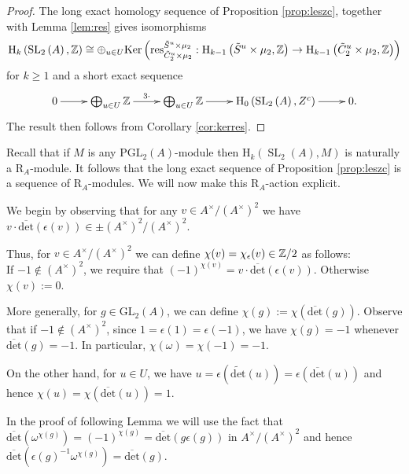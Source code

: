 \documentclass[12pt]{amsart}
\theoremstyle{definition}
\newcommand{\Z}{\Bbb{Z}}
\newcommand{\spl}[2]{\operatorname{SL}_{#1}\left(#2\right)}
\newcommand{\gl}[2]{\mathrm{GL}_{#1}(#2)}
\newcommand{\pgl}[2]{\mathrm{PGL}_{#1}(#2)}
\newcommand{\<}{\langle}
\renewcommand{\>}{\rangle}
\newcommand{\Ker}[1]{\mathrm{Ker}\left( #1\right)}
\newcommand{\sgr}[1]{\mathrm{R}_{#1}}%
\newcommand{\odet}{\overline{\mathrm{det}}}
\newcommand{\oodet}{\widetilde{\mathrm{det}}}
\newcommand{\ho}[3]{\mathrm{H}_{#1}\left( #2,#3 \right)}
\newcommand{\Res}[2]{\mathrm{res}_{#1}^{#2}}
\begin{document}
\begin{proof} The long exact homology sequence of Proposition \ref{prop:leszc}, together with Lemma \ref{lem:res} gives isomorphisms
\[
\ho{k}{\spl{2}{A}}{\Z}\cong \oplus_{u\in U}\Ker{\Res{\tilde{C}_2^u\times\mu_2}{\tilde{S}^u\times\mu_2}:\ho{k-1}{\tilde{S}^u\times\mu_2}{\Z}\to\ho{k-1}{\tilde{C}_2^u\times\mu_2}{\Z}}
\]
for $k\geq 1$ and a short exact sequence
\[
\xymatrix{
0\ar[r]&\bigoplus_{u\in U}\Z\ar^-{3\cdot}[r]&\bigoplus_{u\in U}\Z\ar[r]&\ho{0}{\spl{2}{A}}{Z^c}\ar[r]&0.\\
}
\]
The result then follows from Corollary \ref{cor:kerres}.
\end{proof}



Recall that if $M$ is any $\pgl{2}{A}$-module then $\ho{k}{\spl{2}{A}}{M}$ is naturally a $\sgr{A}$-module. It follows that the long exact sequence of Proposition \ref{prop:leszc} is a sequence of $\sgr{A}$-modules. 
We will now make this $\sgr{A}$-action explicit. 

We begin by observing that for any $v\in A^\times/(A^\times)^2$ we have $v\cdot\odet(\epsilon({v}))\in \pm(A^\times)^2/(A^\times)^2$.

Thus, for $v\in A^\times/(A^\times)^2$ we can define $\chi(v)=\chi_{\epsilon}(v)\in \Z/2$ as follows:\\
If $-1\not\in (A^\times)^2$, we require that $(-1)^{\chi(v)}=v\cdot\odet(\epsilon({v}))$. Otherwise $\chi(v):=0$.  

More generally, for $g\in \gl{2}{A}$, we can define $\chi(g):=\chi(\odet(g))$. Observe that if $-1\not\in (A^\times)^2$, since $1=\epsilon(1)=\epsilon(-1)$, we have $\chi(g)=-1$ 
whenever $\odet(g)=-1$. In particular, $\chi(\omega)=\chi(-1)=-1$. 

On the other hand, for $u\in U$, we have $u=\epsilon(\oodet(u))=\epsilon({\odet(u)})$ and hence $\chi(u)=\chi(\odet(u))=1$.


In the proof of following Lemma we will use the fact that $\odet(\omega^{\chi(g)})=(-1)^{\chi(g)}=\odet(g\epsilon(g))$ in $A^\times/(A^\times)^2$ and hence
$\odet(\epsilon(g)^{-1}\omega^{\chi(g)})= \odet(g)$.
\end{document}
